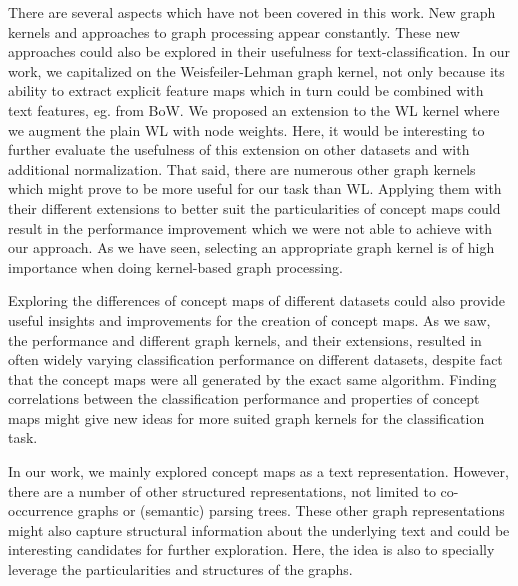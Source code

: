 
There are several aspects which have not been covered in this work.
New graph kernels and approaches to graph processing appear constantly.
These new approaches could also be explored in their usefulness for text-classification.
In our work, we capitalized on the Weisfeiler-Lehman graph kernel, not only because its ability to extract explicit feature maps which in turn could be combined with text features, eg. from BoW.
We proposed an extension to the WL kernel where we augment the plain WL with node weights. Here, it would be interesting to further evaluate the usefulness of this extension on other datasets and with additional normalization.
That said, there are numerous other graph kernels which might prove to be more useful for our task than WL.
Applying them with their different extensions to better suit the particularities of concept maps could result in the performance improvement which we were not able to achieve with our approach.
As we have seen, selecting an appropriate graph kernel is of high importance when doing kernel-based graph processing.

Exploring the differences of concept maps of different datasets could also provide useful insights and improvements for the creation of concept maps.
As we saw, the performance and different graph kernels, and their extensions, resulted in often widely varying classification performance on different datasets, despite fact that the concept maps were all generated by the exact same algorithm.
Finding correlations between the classification performance and properties of concept maps might give new ideas for more suited graph kernels for the classification task.

In our work, we mainly explored concept maps as a text representation.
However, there are a number of other structured representations, not limited to co-occurrence graphs or (semantic) parsing trees.
These other graph representations might also capture structural information about the underlying text and could be interesting candidates for further exploration.
Here, the idea is also to specially leverage the particularities and structures of the graphs.

